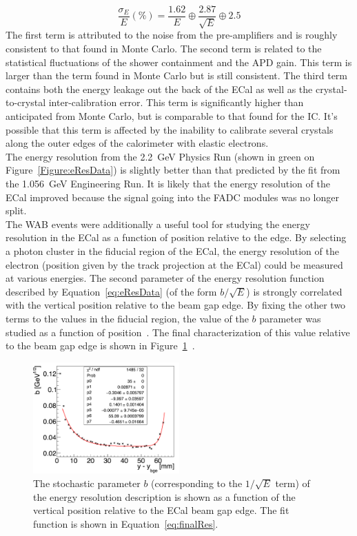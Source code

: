 \begin{equation}
	\label{eq:eResData}
	\dfrac{\sigma_E}{E}(\%) = \dfrac{1.62}{E}\oplus\dfrac{2.87}{\sqrt{E}}\oplus2.5
\end{equation}
The first term is attributed to the noise from the pre-amplifiers and is roughly consistent to that found in Monte Carlo. The second term is related to the statistical fluctuations of the shower containment and the APD gain. This term is larger than the term found in Monte Carlo but is still consistent. The third term contains both the energy leakage out the back of the ECal as well as the crystal-to-crystal inter-calibration error. This term is significantly higher than anticipated from Monte Carlo, but is comparable to that found for the IC. It's possible that this term is affected by the inability to calibrate several crystals along the outer edges of the calorimeter with elastic electrons. \\
\indent The energy resolution from the 2.2~GeV Physics Run (shown in green on Figure~\ref{Figure:eResData}) is slightly better than that predicted by the fit from the 1.056~GeV Engineering Run. It is likely that the energy resolution of the ECal improved because the signal going into the FADC modules was no longer split. \\
\indent The WAB events were additionally a useful tool for studying the energy resolution in the ECal as a function of position relative to the edge. By selecting a photon cluster in the fiducial region of the ECal, the energy resolution of the electron (position given by the track projection at the ECal) could be measured at various energies. The second parameter of the energy resolution function described by Equation~\eqref{eq:eResData} (of the form $b/\sqrt{E}$) is strongly correlated with the vertical position relative to the beam gap edge. By fixing the other two terms to the values in the fiducial region, the value of the $b$ parameter was studied as a function of position~\cite{szumila-vance_hps_2016}. The final characterization of this value relative to the beam gap edge is shown in Figure~\ref{Figure:stochasticEdge}~\cite{balossino_hps_2016}.

\begin{figure}[htb]
  \centering
      \includegraphics[width=0.5\textwidth]{pics/performance/eResEdgeEffect.png}
  \caption[Characterization of the energy resolution edge effects ]{The stochastic parameter $b$ (corresponding to the $1/\sqrt{E}$ term) of the energy resolution description is shown as a function of the vertical position relative to the ECal beam gap edge. The fit function is shown in Equation~\eqref{eq:finalRes}.}
  \label{Figure:stochasticEdge}
\end{figure}


